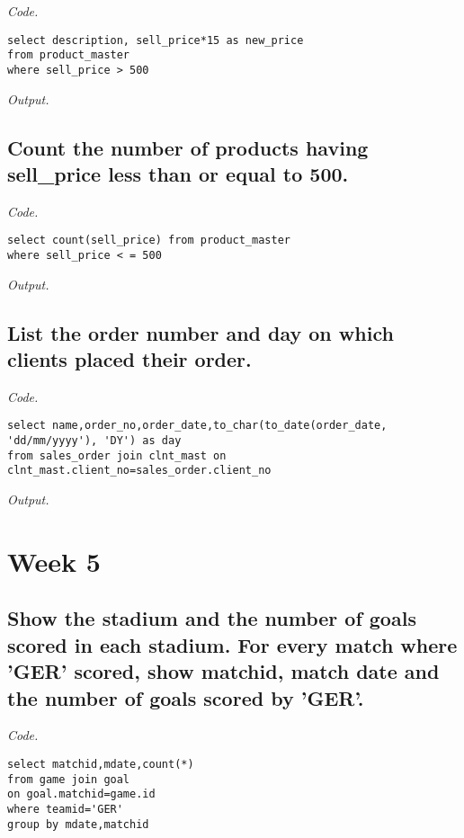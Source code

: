 \documentclass[12pt]{article}
\begin{document}
\textit{Code.}

\begin{lstlisting}
select description, sell_price*15 as new_price 
from product_master
where sell_price > 500
\end{lstlisting}

\textit{Output.}\\

\subsection{Count the number of products having sell\_price less than or equal to 500.}

\textit{Code.}

\begin{lstlisting}
select count(sell_price) from product_master
where sell_price < = 500
\end{lstlisting}

\textit{Output.}\\

\subsection{List the order number and day on which clients placed their order.}

\textit{Code.}

\begin{lstlisting}
select name,order_no,order_date,to_char(to_date(order_date,
'dd/mm/yyyy'), 'DY') as day
from sales_order join clnt_mast on 
clnt_mast.client_no=sales_order.client_no
\end{lstlisting}

\textit{Output.}\\

\section{Week 5}

\subsection{Show the stadium and the number of goals scored in each stadium. For every match where 'GER' scored, show matchid, match date and the number of goals scored by 'GER'.}

\textit{Code.}

\begin{lstlisting}
select matchid,mdate,count(*)
from game join goal 
on goal.matchid=game.id
where teamid='GER'
group by mdate,matchid
\end{lstlisting}
\end{document}
